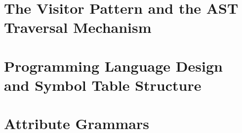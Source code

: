 \documentclass[8pt,a4paper,compress]{beamer}
\begin{document}
\section{The Visitor Pattern and the AST Traversal Mechanism}
\begin{frame}[fragile]
\pause


\end{frame}

\section{Programming Language Design and Symbol Table Structure}
\begin{frame}[fragile]
\pause


\end{frame}

\section{Attribute Grammars}
\begin{frame}[fragile]
\pause


\end{frame}
\end{document}
